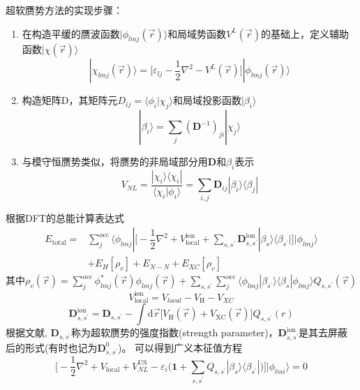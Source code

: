 超软赝势方法的实现步骤：
\begin{enumerate}
	\item 在构造平缓的赝波函数$|\phi_{lmj}(\vec r)\rangle$和局域势函数$V^L(\vec r)$的基础上，定义辅助函数$|\chi(\vec r)\rangle$
\begin{equation}
	|\chi_{lmj}(\vec r)\rangle=\bigg[\varepsilon_{lj}-\dfrac12\nabla^2-V^L(\vec r)\bigg]|\phi_{lmj}(\vec r)\rangle
  \label{eq:uspp_1}
\end{equation}
	\item 构造矩阵$\mathrm{D}$，其矩阵元$D_{ij}=\langle\phi_i|\chi_j\rangle$和局域投影函数$|\beta_i\rangle$
\begin{equation}
	|\beta_i\rangle=\sum_j(\mathbf{D}^{-1})_{ji}|\chi_{j}\rangle
  \label{eq:uspp_2}
\end{equation}
	\item 与模守恒赝势类似，将赝势的非局域部分用$\mathbf{D}$和$\beta_i$表示
\begin{equation}
	V_{NL}=\dfrac{|\chi_i\rangle\langle\chi_i|}{\langle\chi_i|\phi_i\rangle}=\sum_{i,j}\mathbf{D}_{ij}|\beta_i\rangle\langle\beta_j|
  \label{eq:uspp_3}
\end{equation}
\end{enumerate}
根据DFT的总能计算表达式
	\begin{equation} 
		\begin{aligned}
			E_{\mathrm{total}}=&\sum_j^{\mathrm{occ}}\langle\phi_{lmj}|\bigg[-\dfrac12\nabla^2+V_{\mathrm{local}}^{\mathrm{ion}}+\sum_{s,s^{\prime}}\mathbf{D}_{s,s^{\prime}}^{\mathrm{ion}}|\beta_s\rangle\langle\beta_{s^{\prime}}|\bigg]|\phi_{lmj}\rangle\\
			&+E_{H}[\rho_v]+E_{N-N}+E_{XC}[\rho_v]
		\end{aligned}
  \label{eq:uspp_5}
	\end{equation}
其中$\rho_v(\vec r)=\sum\limits_j^{\mathrm{occ}}\phi_{lmj}^{\ast}(\vec r)\phi_{lmj}(\vec r)+\sum\limits_{s,s^{\prime}}\sum\limits_j^{\mathrm{occ}}\langle\phi_{lmj}|\beta_{s^{\prime}}\rangle\langle\beta_s|\phi_{lmj}\rangle Q_{s,s^{\prime}}(\vec r)$
	$$V_{\mathrm{local}}^{\mathrm{ion}}=V_{local}-V_{\mathrm H}-V_{XC}$$
	\begin{equation}
		\mathbf{D}_{s,s^{\prime}}^{\mathrm{ion}}=\mathbf{D}_{s,s^{\prime}}-\int\mathrm{d}\vec r\big[V_{\mathrm{H}}(\vec r)+V_{\mathrm{XC}}(\vec r)\big]Q_{s,s^{\prime}}(r)
		\label{eq:uspp_6}
	\end{equation}
根据文献, $\mathbf{D}_{s,s^{\prime}}$称为超软赝势的强度指数(\textrm{strength parameter})，$\mathbf{D}_{s,s^{\prime}}^{\mathrm{ion}}$是其去屏蔽后的形式(有时也记为$\mathbf{D}_{s,s^{\prime}}^0$)。
可以得到广义本征值方程
\begin{equation}
	\bigg[-\dfrac12\nabla^2+V_{\mathrm{local}}+V_{NL}^{\mathrm{US}}-\varepsilon_i\bigg(\mathbf{1}+\sum_{s,s^{\prime}}Q_{s,s^{\prime}}|\beta_s\rangle\langle\beta_{s^{\prime}}|\bigg)\bigg]|\phi_{lmi}\rangle=0
	\label{eq:uspp_7}
\end{equation}

